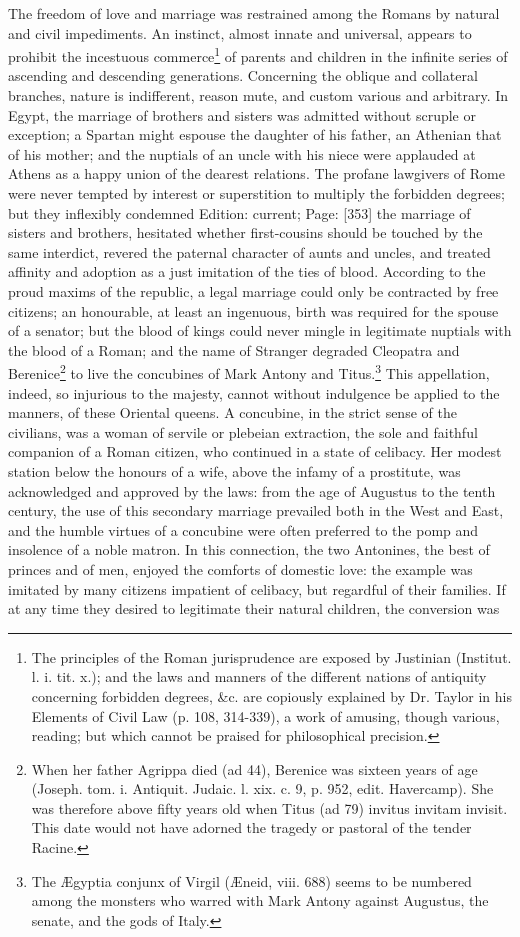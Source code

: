 The freedom of love and marriage was restrained among the Romans by natural and civil impediments. An instinct, almost innate and universal, appears to prohibit the incestuous commerce\footnote{The principles of the Roman jurisprudence are exposed by Justinian (Institut. l. i. tit. x.); and the laws and manners of the different nations of antiquity concerning forbidden degrees, \&c. are copiously explained by Dr. Taylor in his Elements of Civil Law (p. 108, 314-339), a work of amusing, though various, reading; but which cannot be praised for philosophical precision.} of parents and children in the infinite series of ascending and descending generations. Concerning the oblique and collateral branches, nature is indifferent, reason mute, and custom various and arbitrary. In Egypt, the marriage of brothers and sisters was admitted without scruple or exception; a Spartan might espouse the daughter of his father, an Athenian that of his mother; and the nuptials of an uncle with his niece were applauded at Athens as a happy union of the dearest relations. The profane lawgivers of Rome were never tempted by interest or superstition to multiply the forbidden degrees; but they inflexibly condemned Edition: current; Page: [353] the marriage of sisters and brothers, hesitated whether first-cousins should be touched by the same interdict, revered the paternal character of aunts and uncles, and treated affinity and adoption as a just imitation of the ties of blood. According to the proud maxims of the republic, a legal marriage could only be contracted by free citizens; an honourable, at least an ingenuous, birth was required for the spouse of a senator; but the blood of kings could never mingle in legitimate nuptials with the blood of a Roman; and the name of Stranger degraded Cleopatra and Berenice\footnote{When her father Agrippa died (ad 44), Berenice was sixteen years of age (Joseph. tom. i. Antiquit. Judaic. l. xix. c. 9, p. 952, edit. Havercamp). She was therefore above fifty years old when Titus (ad 79) invitus invitam invisit. This date would not have adorned the tragedy or pastoral of the tender Racine.} to live the concubines of Mark Antony and Titus.\footnote{The Ægyptia conjunx of Virgil (Æneid, viii. 688) seems to be numbered among the monsters who warred with Mark Antony against Augustus, the senate, and the gods of Italy.} This appellation, indeed, so injurious to the majesty, cannot without indulgence be applied to the manners, of these Oriental queens. A concubine, in the strict sense of the civilians, was a woman of servile or plebeian extraction, the sole and faithful companion of a Roman citizen, who continued in a state of celibacy. Her modest station below the honours of a wife, above the infamy of a prostitute, was acknowledged and approved by the laws: from the age of Augustus to the tenth century, the use of this secondary marriage prevailed both in the West and East, and the humble virtues of a concubine were often preferred to the pomp and insolence of a noble matron. In this connection, the two Antonines, the best of princes and of men, enjoyed the comforts of domestic love: the example was imitated by many citizens impatient of celibacy, but regardful of their families. If at any time they desired to legitimate their natural children, the conversion was 